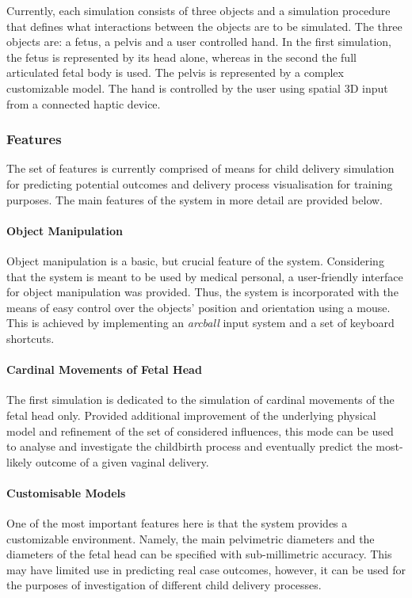 Currently, each simulation consists of three objects and a simulation procedure that defines what interactions between the objects are to be simulated. The three objects are: a fetus, a pelvis and a user controlled hand. In the first simulation, the fetus is represented by its head alone, whereas in the second the full articulated fetal body is used. The pelvis is represented by a complex customizable model. The hand is controlled by the user using spatial 3D input from a connected haptic device.

\subsubsection{Features}

The set of features is currently comprised of means for child delivery simulation for predicting potential outcomes and delivery process visualisation for training purposes. The main features of the system in more detail are provided below.

\paragraph{Object Manipulation}
Object manipulation is a basic, but crucial feature of the system. Considering that the system is meant to be used by medical personal, a user-friendly interface for object manipulation was provided. Thus, the system is incorporated with the means of easy control over the objects' position and orientation using a mouse. This is achieved by implementing an \emph{arcball} input system and a set of keyboard shortcuts.

\paragraph{Cardinal Movements of Fetal Head}
The first simulation is dedicated to the simulation of cardinal movements of the fetal head only. Provided additional improvement of the underlying physical model and refinement of the set of considered influences, this mode can be used to analyse and investigate the childbirth process and eventually predict the most-likely outcome of a given vaginal delivery.


\paragraph{Customisable Models}
One of the most important features here is that the system provides a customizable environment. Namely, the main pelvimetric diameters and the diameters of the fetal head can be specified with sub-millimetric accuracy. This may have limited use in predicting real case outcomes, however, it can be used for the purposes of investigation of different child delivery processes.

